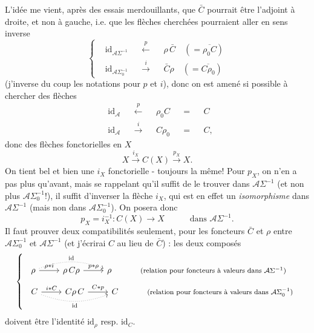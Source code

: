 \documentclass[11pt]{article}
\newcommand{\printedpage}[1]{\marginpar{\footnotesize p.~#1}}
\newcommand{\msp}[1]{\marginpar{\footnotesize [#1]}}
\newcommand{\id}{\mathrm{id}}
\newcommand{\cA}{\mathcal{A}}
\begin{document}
\printedpage{41}

\msp{page 67}
L'idée me vient, après des essais merdouillants, que $\bar{C}$ pourrait être l'adjoint à droite, et non à gauche, i.e. que les flèches cherchées pourraient aller en sens inverse
\[
\left\{
\begin{aligned}
&\id_{\cA\Sigma^{-1}}&&\xleftarrow{\ p\ }&&\rho\,\bar{C}\quad(=\overline{\rho_0C})\\
&\id_{\cA\Sigma_0^{-1}}&&\xrightarrow{\ i\ }&&\bar{C}\rho\quad(=\overline{C\rho_0})
\end{aligned}
\right.
\]
(j'inverse du coup les notations pour $p$ et $i$), donc on est amené si possible à chercher des flèches
\[
\begin{aligned}
&\id_{\cA}&&\xleftarrow{\ p\ }&&\rho_0C&&=&&C\\
&\id_{\cA}&&\xrightarrow{\ i\ }&&C\rho_0&&=&&C,
\end{aligned}
\]
donc des flèches fonctorielles en $X$
\[
X\xrightarrow{i_X}C(X)\xrightarrow{p_X}X.
\]
On tient bel et bien une $i_X$ fonctorielle - toujours la même! Pour $p_X$, on n'en a pas plus qu'avant, mais se rappelant qu'il suffit de le trouver dans $\cA\Sigma^{-1}$ (et non plus $\cA\Sigma_0^{-1}$!), il suffit d'inverser la flèche $i_X$, qui est en effet un \textit{isomorphisme} dans $\cA\Sigma^{-1}$ (mais non dans $\cA\Sigma_0^{-1}$). On posera donc
\[
p_X=i_X^{-1}:C(X)\longrightarrow X\qquad\quad\text{dans }\cA\Sigma^{-1}.
\]
Il faut prouver deux compatibilités seulement, pour les foncteurs $\bar{C}$ et $\rho$ entre $\cA\Sigma_0^{-1}$ et $\cA\Sigma^{-1}$ (et j'écrirai $C$ au lieu de $\bar{C}$) : les deux composés
\[
\left\{
\begin{array}{l}
\begin{tikzcd}[ampersand replacement=\&]
\rho \arrow[r, "\rho*i"] \arrow[rr, bend left=20, dotted, "\id"] \& \rho\,C\rho \arrow[r, "p*\rho"] \& \rho
\end{tikzcd}
\qquad\quad\text{\footnotesize (relation pour foncteurs à valeurs dans $\cA\Sigma^{-1}$)}\\[2ex]
\begin{tikzcd}[ampersand replacement=\&]
C \arrow[r, "i*C"] \arrow[rr, bend right=20, dotted, "\id"'] \& C\rho\,C \arrow[r, "C*p"] \& C
\end{tikzcd}
\qquad\quad\text{\footnotesize (relation pour foncteurs à valeurs dans $\cA\Sigma_0^{-1}$)}
\end{array}
\right.
\]
doivent être l'identité $\id_\rho$ resp. $\id_C$.
\end{document}
